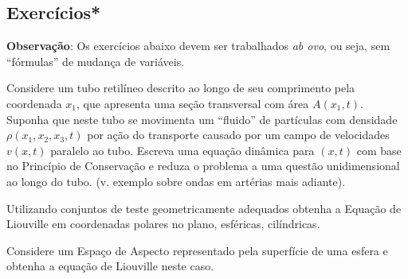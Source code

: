 \subsection{Exercícios*}

\noindent \textbf{Observação}: Os exercícios abaixo devem ser trabalhados \textit{ab ovo}, ou seja, sem ``fórmulas'' de mudança de variáveis.

\begin{exercise}
Considere um tubo retilíneo descrito ao longo de seu comprimento pela coordenada \(x_1\), que apresenta uma seção transversal com área \(A(x_1,t)\). Suponha que neste tubo se movimenta um ``fluido'' de partículas com densidade \(\rho(x_1, x_2, x_3, t)\) por ação do transporte causado por um campo de velocidades \(v(x,t)\) paralelo ao tubo. Escreva uma equação dinâmica para \((x,t)\) com base no Princípio de Conservação e reduza o problema a uma questão unidimensional ao longo do tubo. (v. exemplo sobre ondas em artérias mais adiante).
\end{exercise}

\begin{exercise}
Utilizando conjuntos de teste geometricamente adequados obtenha a Equação de Liouville em coordenadas polares no plano, esféricas, cilíndricas.
\end{exercise}


\begin{exercise}
Considere um Espaço de Aspecto representado pela superfície de uma esfera e obtenha a equação de Liouville neste caso.
\end{exercise}
